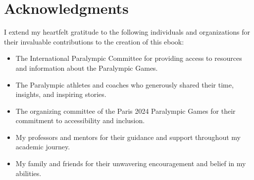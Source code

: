 \chapter*{Acknowledgments} %
I extend my heartfelt gratitude to the following individuals and 
organizations for their invaluable contributions to the creation of this ebook:

\begin{itemize}
    \item The International Paralympic Committee for providing access to resources and information about the Paralympic Games.
    \item The Paralympic athletes and coaches who generously shared their time, insights, and inspiring stories.
    \item The organizing committee of the Paris 2024 Paralympic Games for their commitment to accessibility and inclusion.
    \item My professors and mentors for their guidance and support throughout my academic journey.
    \item My family and friends for their unwavering encouragement and belief in my abilities.
\end{itemize}
